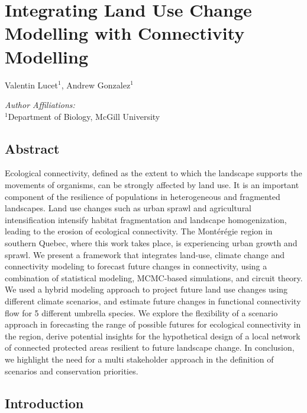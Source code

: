 \chapter{Integrating Land Use Change Modelling with Connectivity Modelling}
\begin{center}
{Valentin Lucet$^{1}$, Andrew Gonzalez$^{1}$}\\
\end{center}
\textit{Author Affiliations:}\\
\normalsize{$^{1}$Department of Biology, McGill University}\\

\newrefsection

\section{Abstract}

Ecological connectivity, defined as the extent to which the landscape supports the movements of organisms, can be strongly affected by land use. It is an important component of the resilience of populations in heterogeneous and fragmented landscapes. Land use changes such as urban sprawl and agricultural intensification intensify habitat fragmentation and landscape homogenization, leading to the erosion of ecological connectivity. The Montérégie region in southern Quebec, where this work takes place, is experiencing urban growth and sprawl. We present a framework that integrates land-use, climate change and connectivity modeling to forecast future changes in connectivity, using a combination of statistical modeling, MCMC-based simulations, and circuit theory. We used a hybrid modeling approach to project future land use changes using different climate scenarios, and estimate future changes in functional connectivity flow for 5 different umbrella species. We explore the flexibility of a scenario approach in forecasting the range of possible futures for ecological connectivity in the region, derive potential insights for the hypothetical design of a local network of connected protected areas resilient to future landscape change. In conclusion, we highlight the need for a multi stakeholder approach in the definition of scenarios and conservation priorities.\\

\newpage

\section{Introduction}
\vspace{2em}

